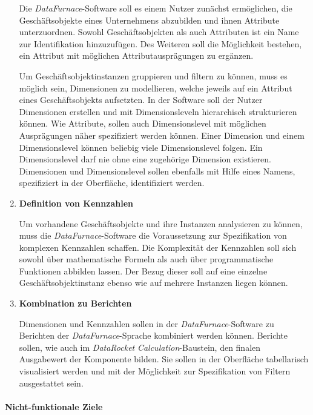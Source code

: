 \documentclass[
  language=german, %
  type=bachelor,%
  ngerman
]{isthesis}
\begin{document}
\begin{content}
\begin{enumerate}
      Die \textit{DataFurnace}-Software soll es einem Nutzer zunächst
      ermöglichen, die Geschäftsobjekte eines Unternehmens abzubilden und ihnen
      Attribute unterzuordnen. Sowohl Geschäftsobjekten als auch Attributen
      ist ein Name zur Identifikation hinzuzufügen. Des Weiteren soll die
      Möglichkeit bestehen, ein Attribut mit möglichen Attributausprägungen zu
      ergänzen.

      Um Geschäftsobjektinstanzen gruppieren und filtern zu können, muss es
      möglich sein, Dimensionen zu modellieren, welche jeweils auf ein Attribut
      eines Geschäftsobjekts aufsetzten. In der Software soll der Nutzer
      Dimensionen erstellen und mit Dimensionsleveln hierarchisch strukturieren
      können. Wie Attribute, sollen auch Dimensionslevel mit möglichen
      Ausprägungen näher spezifiziert werden können. Einer Dimension und einem
      Dimensionslevel können beliebig viele Dimensionslevel folgen. Ein
      Dimensionslevel darf nie ohne eine zugehörige Dimension existieren.
      Dimensionen und Dimensionslevel sollen ebenfalls mit Hilfe eines Namens,
      spezifiziert in der Oberfläche, identifiziert werden.

    \item \textbf{Definition von Kennzahlen}

      Um vorhandene Geschäftsobjekte und ihre Instanzen analysieren zu können,
      muss die \textit{DataFurnace}-Software die Voraussetzung zur
      Spezifikation von komplexen Kennzahlen schaffen. Die Komplexität der
      Kennzahlen soll sich sowohl über mathematische Formeln als auch
      über programmatische Funktionen abbilden lassen. Der Bezug dieser soll auf
      eine einzelne Geschäftsobjektinstanz ebenso wie auf mehrere Instanzen
      liegen können.

    \item \textbf{Kombination zu Berichten}

      Dimensionen und Kennzahlen sollen in der \textit{DataFurnace}-Software zu
      Berichten der \textit{DataFurnace}-Sprache kombiniert werden können.
      Berichte sollen, wie auch im \textit{DataRocket}
      \textit{Calculation}-Baustein, den finalen Ausgabewert der Komponente
      bilden. Sie sollen in der Oberfläche tabellarisch visualisiert werden und
      mit der Möglichkeit zur Spezifikation von Filtern ausgestattet sein.

  \end{enumerate}

  \paragraph{Nicht-funktionale Ziele}
  \begin{enumerate}


\end{enumerate}
\end{content}
\end{document}
